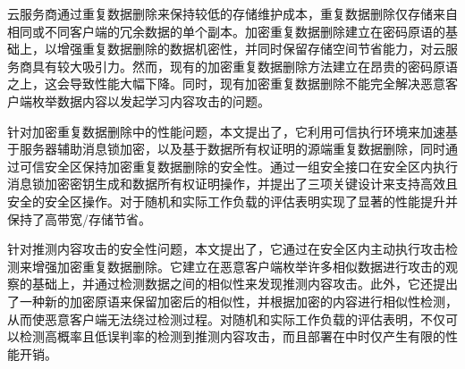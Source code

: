 \begin{chineseabstract}
    云服务商通过重复数据删除来保持较低的存储维护成本，重复数据删除仅存储来自相同或不同客户端的冗余数据的单个副本。加密重复数据删除建立在密码原语的基础上，以增强重复数据删除的数据机密性，并同时保留存储空间节省能力，对云服务商具有较大吸引力。然而，现有的加密重复数据删除方法建立在昂贵的密码原语之上，这会导致性能大幅下降。同时，现有加密重复数据删除不能完全解决恶意客户端枚举数据内容以发起学习内容攻击的问题。

    针对加密重复数据删除中的性能问题，本文提出了\sysnameS，它利用可信执行环境来加速基于服务器辅助消息锁加密，以及基于数据所有权证明的源端重复数据删除，同时通过可信安全区保持加密重复数据删除的安全性。\sysnameS 通过一组安全接口在安全区内执行消息锁加密密钥生成和数据所有权证明操作，并提出了三项关键设计来支持高效且安全的安全区操作。对于随机和实际工作负载的评估表明\sysnameS 实现了显著的性能提升并保持了高带宽/存储节省。

    针对推测内容攻击的安全性问题，本文提出了\sysnameF，它通过在安全区内主动执行攻击检测来增强加密重复数据删除。它建立在恶意客户端枚举许多相似数据进行攻击的观察的基础上，并通过检测数据之间的相似性来发现推测内容攻击。此外，它还提出了一种新的加密原语来保留加密后的相似性，并根据加密的内容进行相似性检测，从而使恶意客户端无法绕过检测过程。对随机和实际工作负载的评估表明，\sysnameF 不仅可以检测高概率且低误判率的检测到推测内容攻击，而且部署在\sysnameS 中时仅产生有限的性能开销。

\end{chineseabstract}


